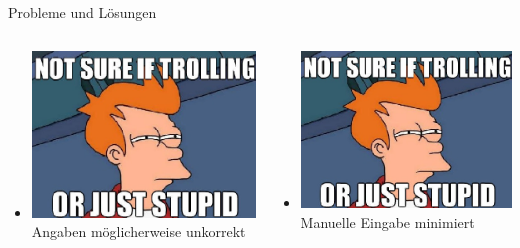 \documentclass{beamer} %
\begin{document}
\begin{frame}{Probleme und Lösungen}
\begin{columns}[c]
\begin{column}{0.5\textwidth}
\begin{itemize}
					\item \includegraphics[height=\baselineskip]{uebung10_Soloninov_Dorkenwald} Angaben möglicherweise unkorrekt
				\end{itemize}
			\end{column}
			\pause
			\begin{column}{0.5\textwidth}
				\begin{itemize}
					\item \includegraphics[height=\baselineskip]{uebung10_Soloninov_Dorkenwald} Manuelle Eingabe minimiert
						\pause

\end{itemize}
\end{column}
\end{columns}
\end{frame}
\end{document}
